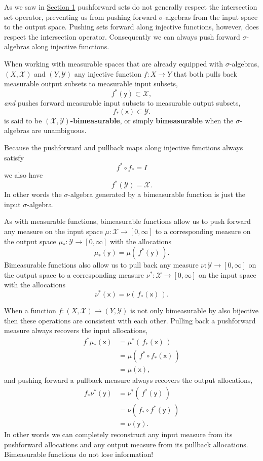 \documentclass[
  letterpaper,
  DIV=11,
  numbers=noendperiod]{scrartcl}
\begin{document}
As we saw in \href{@sec:pushforward-sets}{Section 1} pushforward sets do
not generally respect the intersection set operator, preventing us from
pushing forward \(\sigma\)-algebras from the input space to the output
space. Pushing sets forward along injective functions, however, does
respect the intersection operator. Consequently we can always push
forward \(\sigma\)-algebras along injective functions.

When working with measurable spaces that are already equipped with
\(\sigma\)-algebras, \((X, \mathcal{X})\) and \((Y, \mathcal{Y})\) any
injective function \(f : X \rightarrow Y\) that both pulls back
measurable output subsets to measurable input subsets, \[
f^{*}(\mathsf{y}) \subset \mathcal{X},
\] \emph{and} pushes forward measurable input subsets to measurable
output subsets, \[
f_{*}(\mathsf{x}) \subset \mathcal{Y}.
\] is said to be \textbf{\(( \mathcal{X}, \mathcal{Y} )\)-bimeasurable},
or simply \textbf{bimeasurable} when the \(\sigma\)-algebras are
unambiguous.

Because the pushforward and pullback maps along injective functions
always satisfy \[
f^{*} \circ f_{*} = I
\] we also have \[
f^{*}(\mathcal{Y}) = \mathcal{X}.
\] In other words the \(\sigma\)-algebra generated by a bimeasurable
function is just the input \(\sigma\)-algebra.

As with measurable functions, bimeasurable functions allow us to push
forward any measure on the input space
\(\mu : \mathcal{X} \rightarrow [0, \infty]\) to a corresponding measure
on the output space \(\mu_{*} : \mathcal{Y} \rightarrow [0, \infty]\)
with the allocations \[
\mu_{*}(\mathsf{y}) = \mu( \, f^{*}(\mathsf{y}) \, ).
\] Bimeasurable functions also allow us to pull back any measure
\(\nu : \mathcal{Y} \rightarrow [0, \infty]\) on the output space to a
corresponding measure \(\nu^{*} : \mathcal{X} \rightarrow [0, \infty]\)
on the input space with the allocations \[
\nu^{*}(\mathsf{x}) = \nu( \, f_{*}(\mathsf{x}) \, ).
\]

When a function \(f : (X, \mathcal{X}) \rightarrow (Y, \mathcal{Y})\) is
not only bimeasurable by also bijective then these operations are
consistent with each other. Pulling back a pushforward measure always
recovers the input allocations, \begin{align*}
f^{*} \mu_{*} (\mathsf{x})
&=
\mu^{*}( \, f_{*}(\mathsf{x}) \, )
\\
&=
\mu( \, f^{*} \circ f_{*}(\mathsf{x}) \, )
\\
&=
\mu( \mathsf{x} ),
\end{align*} and pushing forward a pullback measure always recovers the
output allocations, \begin{align*}
f_{*} \nu^{*} (\mathsf{y})
&=
\nu^{*}( \, f^{*}(\mathsf{y}) \, )
\\
&=
\nu( \, f_{*} \circ f^{*}(\mathsf{y}) \, )
\\
&=
\nu( \mathsf{y} ).
\end{align*} In other words we can completely reconstruct any input
measure from its pushforward allocations and any output measure from its
pullback allocations. Bimeasurable functions do not lose information!
\end{document}
